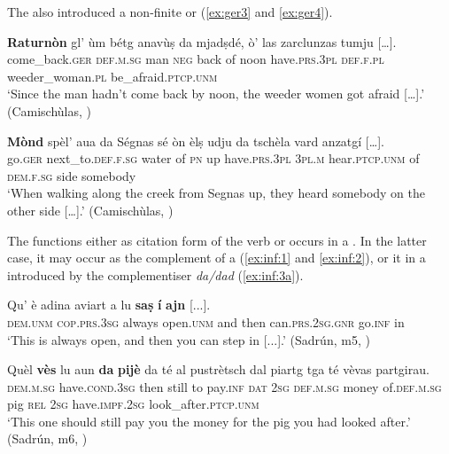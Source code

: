 The  also introduced a non-finite  or  (\ref{ex:ger3} and \ref{ex:ger4}).

\ea\label{ex:ger3}
\gll   \textbf{Raturnòn} gl' ùm bétg anavùṣ da mjadṣdé, ò’ las zarclunzas tumju […].\\
come\_back.\textsc{ger} \textsc{def.m.sg} man \textsc{neg} back of noon have.\textsc{prs.3pl} \textsc{def.f.pl} weeder\_woman.\textsc{pl} be\_afraid.\textsc{ptcp.unm}\\
\glt `Since the man hadn’t come back by noon, the weeder women got afraid […].' (Camischùlas, \citealt[82]{Büchli1966})
\z

\ea\label{ex:ger4}
\gll    \textbf{Mònd} spèl’ aua da Ségnas sé òn èlṣ udju da tschèla vard anzatgí […].\\
     go.\textsc{ger} next\_to.\textsc{def.f.sg} water of  \textsc{pn} up have.\textsc{prs.3pl} \textsc{3pl.m} hear.\textsc{ptcp.unm} of \textsc{dem.f.sg} side somebody \\
\glt `When walking along the creek from Segnas up, they heard somebody on the other side […].' (Camischùlas, \citealt[88]{Büchli1966})
\z


\label{sec:4.1.2.1.3}
The  functions either as citation form of the verb or occurs in a . In the latter case, it may occur as the complement of a   (\ref{ex:inf:1} and \ref{ex:inf:2}), or it in a  introduced by the complementiser \textit{da/dad} (\ref{ex:inf:3a}).

\ea\label{ex:inf:1}
\gll  Qu’ è adina aviart a lu \textbf{saṣ} \textbf{í} \textbf{ajn} [...].\\
\textsc{dem.unm} \textsc{cop.prs.3sg} always open.\textsc{unm} and then can.\textsc{prs.2sg.gnr} go.\textsc{inf} in\\
\glt `This is always open, and then you can step in [...].' (Sadrún, m5, )
\z

\ea\label{ex:inf:2}
\gll    Quèl \textbf{vès} lu aun \textbf{da} \textbf{pijè} da té al pustrètsch dal piartg tga té vèvas partgirau.\\
\textsc{dem.m.sg} have.\textsc{cond.3sg} then still to pay.\textsc{inf} \textsc{dat} \textsc{2sg} \textsc{def.m.sg} money of.\textsc{def.m.sg} pig \textsc{rel} \textsc{2sg} have.\textsc{impf.2sg} look\_after.\textsc{ptcp.unm}\\
\glt `This one should still pay you the money for the pig you had looked after.' (Sadrún, m6, )
\z

